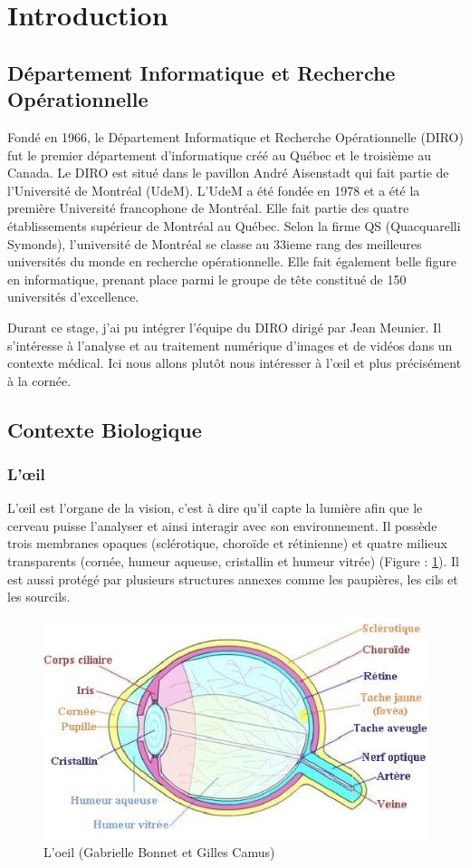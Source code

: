\documentclass[a4paper,12pt]{article}
\begin{document}
\section{Introduction}
	\subsection{Département Informatique et Recherche Opérationnelle}
Fondé en 1966, le Département Informatique et Recherche Opérationnelle (DIRO) fut le premier département d’informatique créé au Québec et le troisième au Canada. Le DIRO est situé dans le pavillon André Aisenstadt qui fait partie de l'Université de Montréal (UdeM). L'UdeM a été fondée en 1978 et a été la première Université francophone de Montréal. Elle fait partie des quatre établissements supérieur de Montréal au Québec. Selon la firme QS (Quacquarelli Symonds), l'université de Montréal se classe au 33ieme rang des meilleures universités du monde en recherche opérationnelle. Elle fait également belle figure en informatique, prenant place parmi le groupe de tête constitué de 150 universités d'excellence. 
		
Durant ce stage, j'ai pu intégrer l'équipe du DIRO dirigé par Jean Meunier. Il s'intéresse à l'analyse et au traitement numérique d’images et de vidéos dans un contexte médical. Ici nous allons plutôt nous intéresser à l'œil et plus précisément à la cornée.

	\subsection{Contexte Biologique}
		\subsubsection{L'œil}
		
L'œil est l'organe de la vision, c'est à dire qu'il capte la lumière afin que le cerveau puisse l'analyser et ainsi interagir avec son environnement. Il possède trois membranes opaques (sclérotique, choroïde et rétinienne) et quatre milieux transparents (cornée, humeur aqueuse, cristallin et humeur vitrée) (Figure : \ref{oeil}). Il est aussi protégé par plusieurs structures annexes comme les paupières, les cils et les sourcils.

\begin{figure}[h]
	\centering
	\includegraphics[width=15cm]{oeil.eps} 
	\caption{L'oeil (Gabrielle Bonnet et Gilles Camus) \cite{oeil1}}
	\label{oeil}
\end{figure}
\end{document}
